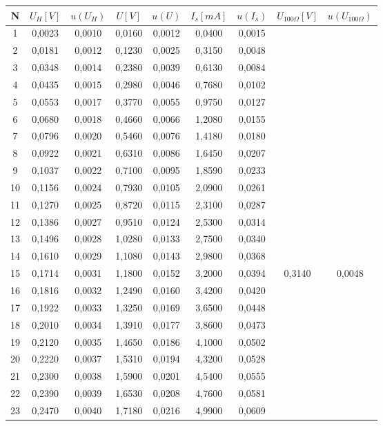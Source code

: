 \documentclass[10pt,a4paper]{article}
\begin{document}
\hfill
\begin{tabular}{c|c|c|c|c|c|c|c|c}
N	&	$U_H [V]$	&	$u(U_H)$	&	$U[V]$	&	$u(U)$	&	 $I_s[mA]$	&	$u(I_s)$	&	 $U_{100\Omega}[V]$	&	$u(U_{100\Omega})$	 \\\hline
1	&	0,0023	&	0,0010	&	0,0160	&	0,0012	&	0,0400	&	0,0015	&		&		 \\
2	&	0,0181	&	0,0012	&	0,1230	&	0,0025	&	0,3150	&	0,0048	&		&		 \\
3	&	0,0348	&	0,0014	&	0,2380	&	0,0039	&	0,6130	&	0,0084	&		&		 \\
4	&	0,0435	&	0,0015	&	0,2980	&	0,0046	&	0,7680	&	0,0102	&		&		 \\
5	&	0,0553	&	0,0017	&	0,3770	&	0,0055	&	0,9750	&	0,0127	&		&		 \\
6	&	0,0680	&	0,0018	&	0,4660	&	0,0066	&	1,2080	&	0,0155	&		&		 \\
7	&	0,0796	&	0,0020	&	0,5460	&	0,0076	&	1,4180	&	0,0180	&		&		 \\
8	&	0,0922	&	0,0021	&	0,6310	&	0,0086	&	1,6450	&	0,0207	&		&		 \\
9	&	0,1037	&	0,0022	&	0,7100	&	0,0095	&	1,8590	&	0,0233	&		&		 \\
10	&	0,1156	&	0,0024	&	0,7930	&	0,0105	&	2,0900	&	0,0261	&		&		 \\
11	&	0,1270	&	0,0025	&	0,8720	&	0,0115	&	2,3100	&	0,0287	&		&		 \\
12	&	0,1386	&	0,0027	&	0,9510	&	0,0124	&	2,5300	&	0,0314	&		&		 \\
13	&	0,1496	&	0,0028	&	1,0280	&	0,0133	&	2,7500	&	0,0340	&		&		 \\
14	&	0,1610	&	0,0029	&	1,1080	&	0,0143	&	2,9800	&	0,0368	&		&		 \\
15	&	0,1714	&	0,0031	&	1,1800	&	0,0152	&	3,2000	&	0,0394	&	0,3140	&	0,0048	 \\
16	&	0,1816	&	0,0032	&	1,2490	&	0,0160	&	3,4200	&	0,0420	&		&		 \\
17	&	0,1922	&	0,0033	&	1,3250	&	0,0169	&	3,6500	&	0,0448	&		&		 \\
18	&	0,2010	&	0,0034	&	1,3910	&	0,0177	&	3,8600	&	0,0473	&		&		 \\
19	&	0,2120	&	0,0035	&	1,4650	&	0,0186	&	4,1000	&	0,0502	&		&		 \\
20	&	0,2220	&	0,0037	&	1,5310	&	0,0194	&	4,3200	&	0,0528	&		&		 \\
21	&	0,2300	&	0,0038	&	1,5900	&	0,0201	&	4,5400	&	0,0555	&		&		 \\
22	&	0,2390	&	0,0039	&	1,6530	&	0,0208	&	4,7600	&	0,0581	&		&		 \\
23	&	0,2470	&	0,0040	&	1,7180	&	0,0216	&	4,9900	&	0,0609	&		&		 \\

\end{tabular}
\end{document}

